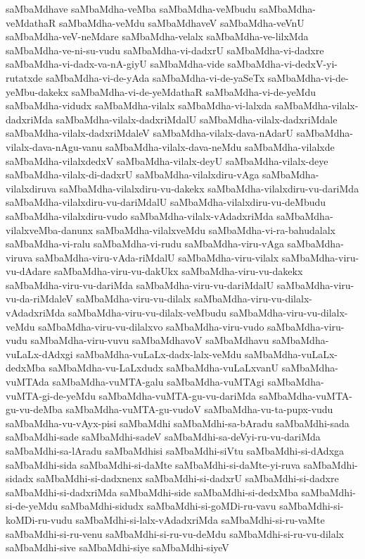 {saMbaMdhave
saMbaMdha-veMba
saMbaMdha-veMbudu
saMbaMdha-veMdathaR
saMbaMdha-veMdu
saMbaMdhaveV
saMbaMdha-veVnU
saMbaMdha-veV-neMdare
saMbaMdha-velalx
saMbaMdha-ve-lilxMda
saMbaMdha-ve-ni-su-vudu
saMbaMdha-vi-dadxrU
saMbaMdha-vi-dadxre
saMbaMdha-vi-dadx-va-nA-giyU
saMbaMdha-vide
saMbaMdha-vi-dedxV-yi-rutatxde
saMbaMdha-vi-de-yAda
saMbaMdha-vi-de-yaSeTx
saMbaMdha-vi-de-yeMbu-dakekx
saMbaMdha-vi-de-yeMdathaR
saMbaMdha-vi-de-yeMdu
saMbaMdha-vidudx
saMbaMdha-vilalx
saMbaMdha-vi-lalxda
saMbaMdha-vilalx-dadxriMda
saMbaMdha-vilalx-dadxriMdalU
saMbaMdha-vilalx-dadxriMdale
saMbaMdha-vilalx-dadxriMdaleV
saMbaMdha-vilalx-dava-nAdarU
saMbaMdha-vilalx-dava-nAgu-vanu
saMbaMdha-vilalx-dava-neMdu
saMbaMdha-vilalxde
saMbaMdha-vilalxdedxV
saMbaMdha-vilalx-deyU
saMbaMdha-vilalx-deye
saMbaMdha-vilalx-di-dadxrU
saMbaMdha-vilalxdiru-vAga
saMbaMdha-vilalxdiruva
saMbaMdha-vilalxdiru-vu-dakekx
saMbaMdha-vilalxdiru-vu-dariMda
saMbaMdha-vilalxdiru-vu-dariMdalU
saMbaMdha-vilalxdiru-vu-deMbudu
saMbaMdha-vilalxdiru-vudo
saMbaMdha-vilalx-vAdadxriMda
saMbaMdha-vilalxveMba-danunx
saMbaMdha-vilalxveMdu
saMbaMdha-vi-ra-bahudalalx
saMbaMdha-vi-ralu
saMbaMdha-vi-rudu
saMbaMdha-viru-vAga
saMbaMdha-viruva
saMbaMdha-viru-vAda-riMdalU
saMbaMdha-viru-vilalx
saMbaMdha-viru-vu-dAdare
saMbaMdha-viru-vu-dakUkx
saMbaMdha-viru-vu-dakekx
saMbaMdha-viru-vu-dariMda
saMbaMdha-viru-vu-dariMdalU
saMbaMdha-viru-vu-da-riMdaleV
saMbaMdha-viru-vu-dilalx
saMbaMdha-viru-vu-dilalx-vAdadxriMda
saMbaMdha-viru-vu-dilalx-veMbudu
saMbaMdha-viru-vu-dilalx-veMdu
saMbaMdha-viru-vu-dilalxvo
saMbaMdha-viru-vudo
saMbaMdha-viru-vudu
saMbaMdha-viru-vuvu
saMbaMdhavoV
saMbaMdhavu
saMbaMdha-vuLaLx-dAdxgi
saMbaMdha-vuLaLx-dadx-lalx-veMdu
saMbaMdha-vuLaLx-dedxMba
saMbaMdha-vu-LaLxdudx
saMbaMdha-vuLaLxvanU
saMbaMdha-vuMTAda
saMbaMdha-vuMTA-galu
saMbaMdha-vuMTAgi
saMbaMdha-vuMTA-gi-de-yeMdu
saMbaMdha-vuMTA-gu-vu-dariMda
saMbaMdha-vuMTA-gu-vu-deMba
saMbaMdha-vuMTA-gu-vudoV
saMbaMdha-vu-ta-pupx-vudu
saMbaMdha-vu-vAyx-pisi
saMbaMdhi
saMbaMdhi-sa-bAradu
saMbaMdhi-sada
saMbaMdhi-sade
saMbaMdhi-sadeV
saMbaMdhi-sa-deVyi-ru-vu-dariMda
saMbaMdhi-sa-lAradu
saMbaMdhisi
saMbaMdhi-siVtu
saMbaMdhi-si-dAdxga
saMbaMdhi-sida
saMbaMdhi-si-daMte
saMbaMdhi-si-daMte-yi-ruva
saMbaMdhi-sidadx
saMbaMdhi-si-dadxnenx
saMbaMdhi-si-dadxrU
saMbaMdhi-si-dadxre
saMbaMdhi-si-dadxriMda
saMbaMdhi-side
saMbaMdhi-si-dedxMba
saMbaMdhi-si-de-yeMdu
saMbaMdhi-sidudx
saMbaMdhi-si-goMDi-ru-vavu
saMbaMdhi-si-koMDi-ru-vudu
saMbaMdhi-si-lalx-vAdadxriMda
saMbaMdhi-si-ru-vaMte
saMbaMdhi-si-ru-venu
saMbaMdhi-si-ru-vu-deMdu
saMbaMdhi-si-ru-vu-dilalx
saMbaMdhi-sive
saMbaMdhi-siye
saMbaMdhi-siyeV
}
